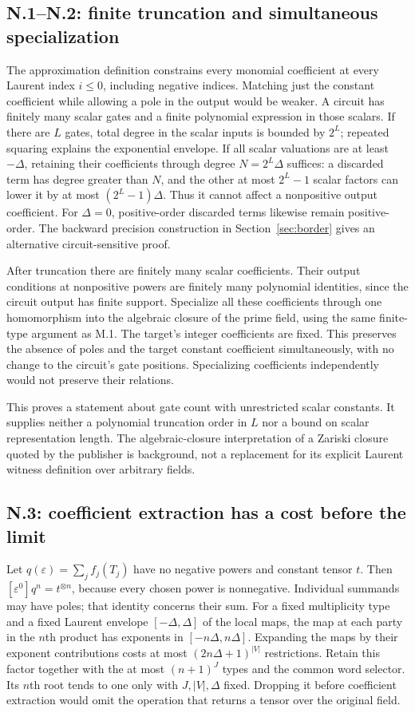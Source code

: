 \documentclass[11pt,letterpaper]{article}
\theoremstyle{definition}\newtheorem{definition}[theorem]{Definition}\newtheorem{example}[theorem]{Example}
\theoremstyle{remark}\newtheorem{remark}[theorem]{Remark}
\begin{document}
\subsection{N.1--N.2: finite truncation and simultaneous specialization}
The approximation definition constrains every monomial coefficient at every Laurent index $i\le0$, including negative indices. Matching just the constant coefficient while allowing a pole in the output would be weaker. A circuit has finitely many scalar gates and a finite polynomial expression in those scalars. If there are $L$ gates, total degree in the scalar inputs is bounded by $2^L$; repeated squaring explains the exponential envelope. If all scalar valuations are at least $-\Delta$, retaining their coefficients through degree $N=2^L\Delta$ suffices: a discarded term has degree greater than $N$, and the other at most $2^L-1$ scalar factors can lower it by at most $(2^L-1)\Delta$. Thus it cannot affect a nonpositive output coefficient. For $\Delta=0$, positive-order discarded terms likewise remain positive-order. The backward precision construction in Section~\ref{sec:border} gives an alternative circuit-sensitive proof.

After truncation there are finitely many scalar coefficients. Their output conditions at nonpositive powers are finitely many polynomial identities, since the circuit output has finite support. Specialize all these coefficients through one homomorphism into the algebraic closure of the prime field, using the same finite-type argument as M.1. The target's integer coefficients are fixed. This preserves the absence of poles and the target constant coefficient simultaneously, with no change to the circuit's gate positions. Specializing coefficients independently would not preserve their relations.

This proves a statement about gate count with unrestricted scalar constants. It supplies neither a polynomial truncation order in $L$ nor a bound on scalar representation length. The algebraic-closure interpretation of a Zariski closure quoted by the publisher is background, not a replacement for its explicit Laurent witness definition over arbitrary fields.

\subsection{N.3: coefficient extraction has a cost before the limit}
Let $q(\varepsilon)=\sum_jf_j(T_j)$ have no negative powers and constant tensor $t$. Then $[\varepsilon^0]q^n=t^{\otimes n}$, because every chosen power is nonnegative. Individual summands may have poles; that identity concerns their sum. For a fixed multiplicity type and a fixed Laurent envelope $[-\Delta,\Delta]$ of the local maps, the map at each party in the $n$th product has exponents in $[-n\Delta,n\Delta]$. Expanding the maps by their exponent contributions costs at most $(2n\Delta+1)^{|V|}$ restrictions. Retain this factor together with the at most $(n+1)^J$ types and the common word selector. Its $n$th root tends to one only with $J,|V|,\Delta$ fixed. Dropping it before coefficient extraction would omit the operation that returns a tensor over the original field.
\end{document}
